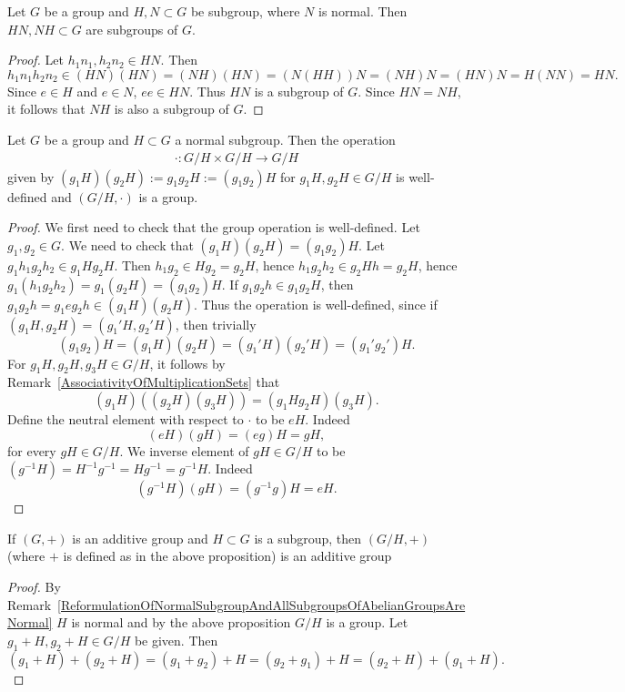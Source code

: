 \begin{proposition}
    Let $G$ be a group and $H,N\subset G$ be subgroup, where $N$ is normal. Then $HN,NH\subset G$ are subgroups of $G$. 
\end{proposition}
\begin{proof}
    Let $h_1n_1,h_2n_2\in HN$. Then 
    $$h_1n_1h_2n_2 \in (HN)(HN)=(NH)(HN) = (N(HH))N=(NH)N=(HN)N=H(NN) = HN. $$
    Since $e\in H$ and $e\in N$, $ee\in HN$. Thus $HN$ is a subgroup of $G$. Since $HN=NH$, it follows that $NH$ is also a subgroup of $G$. 
\end{proof}
\begin{proposition}
    Let $G$ be a group and $H\subset G$ a normal subgroup. Then the operation
    \begin{align*}
        \cdot : G/H \times G/H \rightarrow G/H
    \end{align*}
    given by $(g_1H)(g_2H) := g_1g_2H := (g_1g_2)H$ for $g_1H,g_2H\in G/H$ is well-defined and $(G/H,\cdot)$ is a group. 
\end{proposition}
\begin{proof}
    We first need to check that the group operation is well-defined. Let $g_1,g_2\in G$. We need to check that $(g_1H)(g_2H) = (g_1g_2) H$. Let $g_1h_1g_2h_2\in g_1Hg_2H$. Then $h_1g_2\in Hg_2 = g_2H$, hence $h_1g_2h_2\in g_2Hh = g_2H$, hence $g_1(h_1g_2h_2) = g_1(g_2H)=(g_1g_2)H.$ If $g_1g_2h \in g_1g_2H$, then $g_1g_2h = g_1eg_2h\in (g_1H)(g_2H)$. Thus the operation is well-defined, since if $(g_1H,g_2H)=(g_1'H,g_2'H)$, then trivially 
    $$(g_1g_2)H=(g_1H)(g_2H) =(g_1'H)(g_2'H) = (g_1'g_2')H.$$
    For $g_1H,g_2H,g_3H\in G/H$, it follows by Remark~\ref{AssociativityOfMultiplicationSets} that 
    $$(g_1H)((g_2H)(g_3H)) = (g_1Hg_2H)(g_3H).$$
    Define the neutral element with respect to $\cdot$ to be $eH$. Indeed
    $$(eH)(gH) = (eg)H=gH,$$
    for every $gH\in G/H$. We inverse element of $gH\in G/H$ to be $(g^{-1}H) = H^{-1}g^{-1} = Hg^{-1} = g^{-1}H$. Indeed 
    $$(g^{-1}H)(gH) = (g^{-1}g)H= eH.$$
\end{proof}
\begin{corollary}\label{QuotientGroupOfAdditiveGroupIsAdditive}
    If $(G,+)$ is an additive group and $H\subset G$ is a subgroup, then $(G/H,+)$ (where $+$ is defined as in the above proposition) is an additive group
\end{corollary}
\begin{proof}
    By Remark~\ref{ReformulationOfNormalSubgroupAndAllSubgroupsOfAbelianGroupsAreNormal} $H$ is normal and by the above proposition $G/H$ is a group. Let $g_1+H,g_2+H\in G/H$ be given. Then
    $$(g_1+H)+(g_2+H) = (g_1+g_2)+H = (g_2+g_1)+H = (g_2+H)+(g_1+H).$$
\end{proof}
